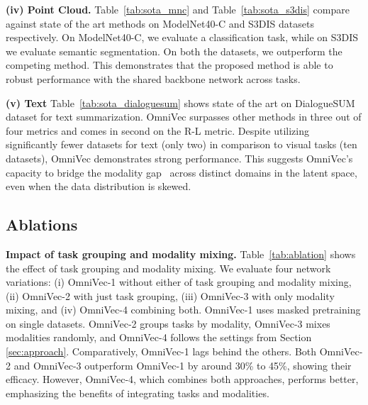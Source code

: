 \noindent\textbf{(iv) Point Cloud.} Table~\ref{tab:sota_mnc} and Table~\ref{tab:sota_s3dis} compare against state of the art methods on ModelNet40-C and S3DIS datasets respectively. On ModelNet40-C, we evaluate a classification task, while on S3DIS we evaluate semantic segmentation. On both the datasets, we outperform the competing method. This demonstrates that the proposed method is able to robust performance with the shared backbone network across tasks. 

\noindent\textbf{(v) Text} 
Table~\ref{tab:sota_dialoguesum} shows state of the art on DialogueSUM dataset for text summarization. OmniVec surpasses other methods in three out of four metrics and comes in second on the R-L metric. Despite utilizing significantly fewer datasets for text (only two) in comparison to visual tasks (ten datasets), OmniVec demonstrates strong performance. This suggests OmniVec's capacity to bridge the modality gap~\cite{liang2022mind} across distinct domains in the latent space, even when the data distribution is skewed.

\subsection{Ablations}

\noindent\textbf{Impact of task grouping and modality mixing.} Table~\ref{tab:ablation} shows the effect of task grouping and modality mixing. We evaluate four network variations: (i) OmniVec-1 without either of task grouping and modality mixing, (ii) OmniVec-2 with just task grouping, (iii) OmniVec-3 with only modality mixing, and (iv) OmniVec-4 combining both. OmniVec-1 uses masked pretraining on single datasets. OmniVec-2 groups tasks by modality, OmniVec-3 mixes modalities randomly, and OmniVec-4 follows the settings from Section \ref{sec:approach}. Comparatively, OmniVec-1 lags behind the others. Both OmniVec-2 and OmniVec-3 outperform OmniVec-1 by around 30\% to 45\%, showing their efficacy. However, OmniVec-4, which combines both approaches, performs better, emphasizing the benefits of integrating tasks and modalities.

